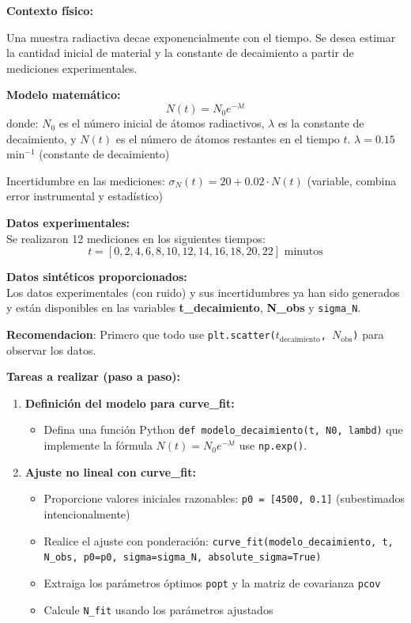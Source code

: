 \documentclass[10pt]{article}
\begin{document}
\begin{tcolorbox}[title={Pregunta 2 – Decaimiento Radiactivo (scipy.optimize.curve\_fit)}]

\noindent\textbf{Contexto físico:}

Una muestra radiactiva decae exponencialmente con el tiempo. Se desea estimar la cantidad inicial de material y la constante de decaimiento a partir de mediciones experimentales.

\noindent\textbf{Modelo matemático:}
\[
N(t) = N_0 e^{-\lambda t}
\]
donde: $N_0$ es el número inicial de átomos radiactivos, $\lambda$ es la constante de decaimiento, y $N(t)$ es el número de átomos restantes en el tiempo $t$.
$\lambda = 0.15$ min$^{-1}$ (constante de decaimiento)

Incertidumbre en las mediciones: $\sigma_N(t) = 20 + 0.02 \cdot N(t)$ (variable, combina error instrumental y estadístico)


\noindent\textbf{Datos experimentales:}\\
Se realizaron 12 mediciones en los siguientes tiempos:
\[
 t = [0, 2, 4, 6, 8, 10, 12, 14, 16, 18, 20, 22] \text{ minutos}
\]

\noindent\textbf{Datos sintéticos proporcionados:}\\[0.3em]
Los datos experimentales (con ruido) y sus incertidumbres ya han sido generados y están disponibles en las variables \textbf{t\_decaimiento}, \textbf{N\_obs} y \texttt{sigma\_N}.

\noindent\textbf{Recomendacion}: Primero que todo use \texttt{plt.scatter($t_{\text{decaimiento}}$, $N_{\text{obs}}$)} para observar los datos.

\noindent\textbf{Tareas a realizar (paso a paso):}

\begin{enumerate}
  \item \textbf{Definición del modelo para curve\_fit:}
  \begin{itemize}
    \item Defina una función Python \texttt{def modelo\_decaimiento(t, N0, lambd)} que implemente la fórmula $N(t) = N_0 e^{-\lambda t}$ use \texttt{np.exp()}.
  \end{itemize}
  
  \item \textbf{Ajuste no lineal con curve\_fit:}
  \begin{itemize}
    \item Proporcione valores iniciales razonables: \texttt{p0 = [4500, 0.1]} (subestimados intencionalmente)
    \item Realice el ajuste con ponderación: \texttt{curve\_fit(modelo\_decaimiento, t, N\_obs, p0=p0, sigma=sigma\_N, absolute\_sigma=True)}
    \item Extraiga los parámetros óptimos \texttt{popt} y la matriz de covarianza \texttt{pcov}
    \item Calcule \texttt{N\_fit} usando los parámetros ajustados
  \end{itemize}
  

\end{enumerate}
\end{tcolorbox}
\end{document}
